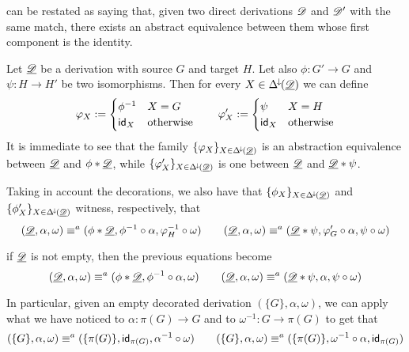 \begin{remark}\label{rem:res}  can be restated as saying that, given two direct derivations $\mathscr{D}$ and $\mathscr{D'}$ with the same match, there exists an abstract equivalence between them whose first component is the identity. 
\end{remark}

\begin{remark}\label{rem:absequi}
	Let $\underline{\mathscr{D}}$ be a derivation with source $G$ and target $H$. Let also $\phi\colon G'\to G$ and $\psi\colon H\to H'$ be two isomorphisms. Then for every $X\in \Delta^{\hspace{-1pt}\downarrow\hspace{-1pt}}(\underline{\mathscr{D}})$ we can define 
	\[\varphi_X:=\begin{cases}
		\phi^{-1} & X=G\\
		\mathsf{id}_{X} & \text{otherwise}
	\end{cases} \qquad \varphi'_X:=\begin{cases}
		\psi & X=H\\
		\mathsf{id}_{X} & \text{otherwise}
	\end{cases}\]
	It is immediate to see that the family $\{\varphi_X\}_{X\in \Delta^{\hspace{-1pt}\downarrow\hspace{-1pt}}(\underline{\mathscr{D}})}$ is an abstraction equivalence between $\underline{\mathscr{D}}$ and $\phi *\underline{\mathscr{D}}$, while $\{\varphi'_X\}_{X\in \Delta^{\hspace{-1pt}\downarrow\hspace{-1pt}}(\underline{\mathscr{D}})}$ is one between $\underline{\mathscr{D}}$ and $\underline{\mathscr{D}}*\psi$.  
	
	Taking in account the decorations, we also have that $\{\phi_X\}_{X\in \Delta^{\hspace{-1pt}\downarrow\hspace{-1pt}}(\underline{\mathscr{D}})}$ and  $\{\phi'_X\}_{X\in \Delta^{\hspace{-1pt}\downarrow\hspace{-1pt}}(\underline{\mathscr{D}})}$ witness, respectively, that 
	\[(\underline{\mathscr{D}}, \alpha, \omega) \equiv^a (\phi * \underline{\mathscr{D}}, \phi^{-1}\circ \alpha,   \varphi^{-1}_{H} \circ \omega) \qquad (\underline{\mathscr{D}}, \alpha, \omega) \equiv^a ( \underline{\mathscr{D}}*\psi, \varphi'_{G} \circ \alpha, \psi \circ \omega )\]

if $\underline{\mathscr{D}}$ is not empty, then the previous equations become
\[(\underline{\mathscr{D}}, \alpha, \omega) \equiv^a (\phi * \underline{\mathscr{D}}, \phi^{-1}\circ \alpha,   \omega) \qquad (\underline{\mathscr{D}}, \alpha, \omega) \equiv^a ( \underline{\mathscr{D}}*\psi, \alpha, \psi \circ \omega )\]

In particular, given an empty decorated derivation $(\{G\}, \alpha, \omega)$, we can apply what we have noticed to $\alpha \colon \pi(G)\to G$ and to $\omega^{-1}\colon G\to \pi(G) $ to get that 
\[(\{G\}, \alpha, \omega)\equiv^a (\{\pi(G)\}, \mathsf{id}_{\pi(G)}, \alpha^{-1}\circ \omega) \qquad (\{G\}, \alpha, \omega)\equiv^a (\{\pi(G)\}, 	\omega^{-1}\circ \alpha, \mathsf{id}_{\pi(G)})\]
\end{remark}


